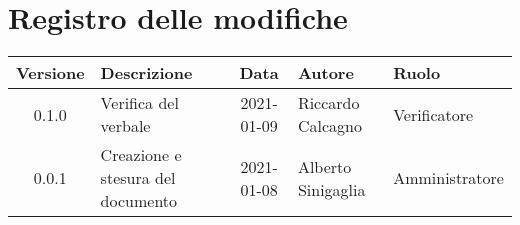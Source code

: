 \section*{Registro delle modifiche}

\begin{center}
	\begin{longtable}{|c|p{3.5cm}|c|p{3cm}|p{3cm}|}
		\hline
		\rowcolor{lighter-grayer}
		\textbf{Versione} & \textbf{Descrizione} & \textbf{Data} & \textbf{Autore} & \textbf{Ruolo} \\
		\hline
		\endfirsthead
		0.1.0 & Verifica del verbale & 2021-01-09 & Riccardo Calcagno & Verificatore \\
		\hline
		0.0.1 & Creazione e stesura del documento & 2021-01-08 & Alberto Sinigaglia & Amministratore \\
		\hline

	\end{longtable}
\end{center}
